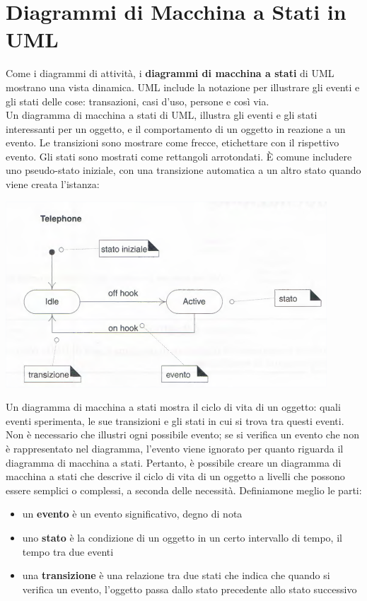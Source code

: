 \documentclass[a4paper,12pt, oneside]{book}
\begin{document}
\chapter{Diagrammi di Macchina a Stati in UML}
Come i diagrammi di attività, i \textbf{diagrammi di macchina a stati} di UML mostrano una vista dinamica. UML include la notazione per illustrare gli eventi e gli stati delle cose: transazioni, casi d'uso, persone e così via.\\
Un diagramma di macchina a stati di UML, illustra
gli eventi e gli stati interessanti per un oggetto, e il comportamento di un oggetto in reazione a un evento. Le transizioni sono mostrare come frecce, etichettare con il rispettivo evento. Gli stati sono mostrati come rettangoli arrotondati. È comune includere uno pseudo-stato iniziale, con una transizione automatica a un altro stato quando viene creata l'istanza:
\begin{center}
	\includegraphics[scale=0.6]{img/statd.png}
\end{center}
Un diagramma di macchina a stati mostra il ciclo di vita di un oggetto: quali eventi sperimenta, le sue transizioni e gli stati in cui si trova tra questi eventi. Non è necessario
che illustri ogni possibile evento; se si verifica un evento che non è rappresentato nel diagramma, l'evento viene ignorato per quanto riguarda il diagramma di macchina a stati. Pertanto, è possibile creare un diagramma di macchina a stati che descrive il ciclo di vita di un oggetto a livelli che possono essere semplici o complessi, a seconda delle necessità. Definiamone meglio le parti:
\begin{itemize}
	\item un \textbf{evento} è un evento significativo, degno di nota
	\item uno \textbf{stato }è la condizione di un oggetto in un certo intervallo di tempo, il tempo tra due eventi
	\item una \textbf{transizione} è una relazione tra due stati che indica che quando si verifica un evento, l'oggetto passa dallo stato precedente allo stato successivo
\end{itemize}
\end{document}
